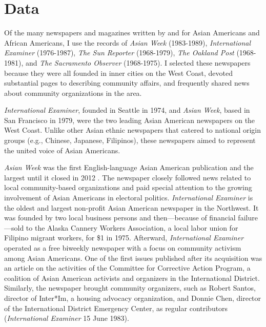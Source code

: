 \documentclass[12 pt]{article}
\begin{document}
\section{Data}

Of the many newspapers and magazines written by and for Asian Americans and African Americans, I use the records of \textit{Asian Week} (1983-1989), \textit{International Examiner} (1976-1987), \textit{The Sun Reporter} (1968-1979), \textit{The Oakland Post} (1968-1981), and \textit{The Sacramento Observer} (1968-1975). I selected these newspapers because they were all founded in inner cities on the West Coast, devoted substantial pages to describing community affairs, and frequently shared news about community organizations in the area. 

\textit{International Examiner}, founded in Seattle in 1974, and \textit{Asian Week}, based in San Francisco in 1979, were the two leading Asian American newspapers on the West Coast. Unlike other Asian ethnic newspapers that catered to national origin groups (e.g., Chinese, Japanese, Filipinos), these newspapers aimed to represent the united voice of Asian Americans.

\textit{Asian Week} was the first English-language Asian American publication and the largest until it closed in 2012 \citep[29-31]{ling2015asian}. The newspaper closely followed news related to local community-based organizations and paid special attention to the growing involvement of Asian Americans in electoral politics. \textit{International Examiner} is the oldest and largest non-profit Asian American newspaper in the Northwest. It was founded by two local business persons and then---because of financial failure---sold to the Alaska Cannery Workers Association, a local labor union for Filipino migrant workers, for \$1 in 1975. Afterward, \textit{International Examiner} operated as a free biweekly newspaper with a focus on community activism among Asian Americans. One of the first issues published after its acquisition was an article on the activities of the Committee for Corrective Action Program, a coalition of Asian American activists and organizers in the International District. Similarly, the newspaper brought community organizers, such as Robert Santos, director of Inter*Im, a housing advocacy organization, and Donnie Chen, director of the International District Emergency Center, as regular contributors (\textit{International Examiner} 15 June 1983). 
\end{document}
